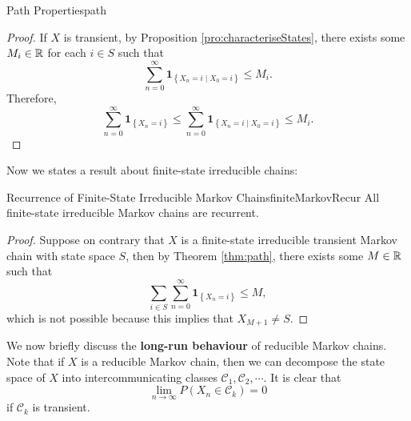 \documentclass[math, code]{amznotes}
\theoremstyle{remark}
\begin{document}
\begin{thmbox}{Path Properties}{path}
\begin{proof}
        If $X$ is transient, by Proposition \ref{pro:characteriseStates}, there exists some $M_i \in \mathbb{R}$ for each $i \in S$ such that 
        \begin{equation*}
            \sum_{n = 0}^{\infty}\mathbf{1}_{\left\{X_n = i \mid X_0 = i\right\}} \leq M_i.
        \end{equation*}
        Therefore, 
        \begin{equation*}
            \sum_{n = 0}^{\infty}\mathbf{1}_{\left\{X_n = i\right\}} \leq \sum_{n = 0}^{\infty}\mathbf{1}_{\left\{X_n = i \mid X_0 = i\right\}} \leq M_i.
        \end{equation*}
    \end{proof}
\end{thmbox}
Now we states a result about finite-state irreducible chains:
\begin{corbox}{Recurrence of Finite-State Irreducible Markov Chains}{finiteMarkovRecur}
    All finite-state irreducible Markov chains are recurrent.
    \tcblower
    \begin{proof}
        Suppose on contrary that $X$ is a finite-state irreducible transient Markov chain with state space $S$, then by Theorem \ref{thm:path}, there exists some $M \in \mathbb{R}$ such that 
        \begin{equation*}
            \sum_{i \in S}\sum_{n = 0}^{\infty}\mathbf{1}_{\left\{X_n = i\right\}} \leq M,
        \end{equation*}
        which is not possible because this implies that $X_{M + 1} \neq S$.
    \end{proof}
\end{corbox}
We now briefly discuss the \textbf{long-run behaviour} of reducible Markov chains. Note that if $X$ is a reducible Markov chain, then we can decompose the state space of $X$ into intercommunicating classes $\mathcal{C}_1, \mathcal{C}_2, \cdots$. It is clear that 
\begin{equation*}
    \lim_{n \to \infty}P\left(X_n \in \mathcal{C}_k\right) = 0
\end{equation*}
if $\mathcal{C}_k$ is transient. 
\end{document}
